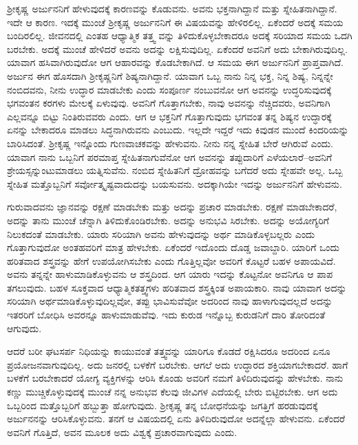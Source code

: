 ಶ‍್ರೀಕೃಷ್ಣ ಅರ್ಜುನನಿಗೆ ಹೇಳುವುದಕ್ಕೆ ಕಾರಣವನ್ನು ಕೊಡುವನು. ಅವನು ಭಕ್ತನಾಗಿದ್ದಾನೆ ಮತ್ತು ಸ್ನೇಹಿತನಾಗಿದ್ದಾನೆ. ಇದೇ ಆ ಕಾರಣ. ಇದಕ್ಕೆ ಮುಂಚೆ ಶ‍್ರೀಕೃಷ್ಣ ಅರ್ಜುನನಿಗೆ ಈ ವಿಷಯವನ್ನು ಹೇಳಿರಲಿಲ್ಲ. ಏಕೆಂದರೆ ಅದಕ್ಕೆ ಸಮಯ ಬಂದಿರಲಿಲ್ಲ. ಜೀವನದಲ್ಲಿ ಎಂತಹ ಆಧ್ಯಾತ್ಮಿಕ ತತ್ತ್ವ ವನ್ನು ತಿಳಿದುಕೊಳ್ಳಬೇಕಾದರೂ ಅದಕ್ಕೆ ಸರಿಯಾದ ಸಮಯ ಒದಗಿ ಬರಬೇಕು. ಅದಕ್ಕೆ ಮುಂಚೆ ಹೇಳಿದರೆ ಅವನು ಅದನ್ನು ಲಕ್ಷಿಸುವುದಿಲ್ಲ. ಏಕೆಂದರೆ ಅವನಿಗೆ ಅದು ಬೇಕಾಗಿರುವುದಿಲ್ಲ. ಯಾವಾಗ ಹಸಿವಾಗಿರುವುದೋ ಆಗ ಆಹಾರವನ್ನು ಕೊಡಬೇಕಾಗಿದೆ. ಆ ಸಮಯ ಈಗ ಅರ್ಜುನನಿಗೆ ಪ್ರಾಪ್ತವಾಗಿದೆ. ಅರ್ಜುನ ಈಗ ಹೊಸದಾಗಿ ಶ‍್ರೀಕೃಷ್ಣನಿಗೆ ಶಿಷ್ಯನಾಗಿದ್ದಾನೆ. ಯಾವಾಗ ಒಬ್ಬ ನಾನು ನಿನ್ನ ಭಕ್ತ, ನಿನ್ನ ಶಿಷ್ಯ, ನಿನ್ನನ್ನೇ ನಂಬಿದವನು, ನೀನು ಉದ್ಧಾರ ಮಾಡಬೇಕು ಎಂದು ಸಂಪೂರ್ಣ ನಂಬುವನೋ ಆಗ ಅವನನ್ನು ಉದ್ಧರಿಸುವುದಕ್ಕೆ ಭಗವಂತನ ಕರಗಳು ಮೇಲಕ್ಕೆ ಏಳುವುವು. ಅವನಿಗೆ ಗೊತ್ತಾಗಬೇಕು, ನಾವು ಅವನನ್ನು ನೆಚ್ಚಿದವರು, ಅವನಿಗಾಗಿ ಎಲ್ಲವನ್ನೂ ಬಿಟ್ಟು ನಿಂತಿರುವವರು ಎಂದು. ಆಗ ಆ ಭಕ್ತನಿಗೆ ಗೊತ್ತಾಗುವುದು ಭಗವಂತ ತನ್ನ ಶಿಷ್ಯನ ಉದ್ಧಾರಕ್ಕೆ ಏನನ್ನು ಬೇಕಾದರೂ ಮಾಡಲು ಸಿದ್ಧನಾಗಿರುವನು ಎಂಬುದು. ಇಲ್ಲದೇ ಇದ್ದರೆ ಇದು ಕಿವುಡನ ಮುಂದೆ ಕಿಂದರಿಯನ್ನು ಬಾರಿಸಿದಂತೆ. ಶ‍್ರೀಕೃಷ್ಣ ಇನ್ನೊಂದು ಗುಣವಾಚಕವನ್ನು ಹೇಳುವನು. ನೀನು ನನ್ನ ಸ್ನೇಹಿತ ಬೇರೆ ಆಗಿರುವೆ ಎಂದು. ಯಾವಾಗ ನಾನು ಒಬ್ಬನಿಗೆ ಪರಮಾಪ್ತ ಸ್ನೇಹಿತನಾಗುವೆನೋ ಆಗ ಅವನನ್ನು ತಪ್ಪುದಾರಿಗೆ ಎಳೆಯಲಾರೆ–ಅವನಿಗೆ ಶ್ರೇಯಸ್ಸನ್ನುಂಟುಮಾಡಲು ಯತ್ನಿಸುವೆನು. ನಂಬಿದ ಸ್ನೇಹಿತನಿಗೆ ದ್ರೋಹವನ್ನು ಬಗೆದರೆ ಅದು ಸ್ನೇಹವೇ ಅಲ್ಲ. ಒಬ್ಬ ಸ್ನೇಹಿತ ಮತ್ತೊಬ್ಬನಿಗೆ ಸರ್ವೋತ್ಕೃಷ್ಟವಾದುದನ್ನು ಬಯಸುವನು. ಅದಕ್ಕಾಗಿಯೇ ಇದನ್ನು ಅರ್ಜುನನಿಗೆ ಹೇಳುವನು.

ಗುರುವಾದವನು ಜ್ಞಾನವನ್ನು ರಕ್ಷಣೆ ಮಾಡಬೇಕು ಮತ್ತು ಅದನ್ನು ಪ್ರಚಾರ ಮಾಡಬೇಕು. ರಕ್ಷಣೆ ಮಾಡಬೇಕಾದರೆ, ಅದನ್ನು ತಾನು ಮುಂಚೆ ಚೆನ್ನಾಗಿ ತಿಳಿದುಕೊಂಡಿರಬೇಕು. ಅದನ್ನು ಅನುಭವಿ ಸಿರಬೇಕು. ಅದನ್ನು ಅಯೋಗ್ಯರಿಗೆ ನಿಲುಕದಂತೆ ಮಾಡಬೇಕು. ಯಾರು ಸರಿಯಾಗಿ ಅವನು ಹೇಳುವುದನ್ನು ಅರ್ಥ ಮಾಡಿಕೊಳ್ಳಬಲ್ಲರು ಎಂದು ಗೊತ್ತಾಗುವುದೋ ಅಂತಹವರಿಗೆ ಮಾತ್ರ ಹೇಳಬೇಕು. ಏಕೆಂದರೆ ಇದೊಂದು ದೊಡ್ಡ ಜವಾಬ್ದಾರಿ. ಯಾರಿಗೆ ಒಂದು ಹರಿತವಾದ ಶಸ್ತ್ರವನ್ನು ಹೇಗೆ ಉಪಯೋಗಿಸಬೇಕು ಎಂದು ಗೊತ್ತಿಲ್ಲವೋ ಅವರಿಗೆ ಕೊಟ್ಟರೆ ಬಹಳ ಅಪಾಯವಿದೆ. ಅವನು ತನ್ನನ್ನೇ ಹಾಳುಮಾಡಿಕೊಳ್ಳುವನು ಆ ಶಸ್ತ್ರದಿಂದ. ಆಗ ಯಾರು ಇದನ್ನು ಕೊಟ್ಟನೋ ಅವನಿಗೂ ಆ ಪಾಪ ತಗಲುವುದು. ಬಹಳ ಸೂಕ್ತವಾದ ಆಧ್ಯಾತ್ಮಿಕತತ್ತ್ವಗಳು ಹರಿತವಾದ ಶಸ್ತ್ರಕ್ಕಿಂತ ಅಪಾಯಕಾರಿ. ನಾವು ಯಾವಾಗ ಅದನ್ನು ಸರಿಯಾಗಿ ಅರ್ಥಮಾಡಿಕೊಳ್ಳುವುದಿಲ್ಲವೋ, ತಪ್ಪು ಭಾವಿಸುವೆವೋ ಅದರಿಂದ ನಾವು ಹಾಳಾಗುವುದಲ್ಲದೆ ಅದನ್ನು ಇತರರಿಗೆ ಬೋಧಿಸಿ ಅವರನ್ನೂ ಹಾಳುಮಾಡುವೆವು. ಇದು ಕುರುಡ ಇನ್ನೊಬ್ಬ ಕುರುಡನಿಗೆ ದಾರಿ ತೋರಿದಂತೆ ಆಗುವುದು.

ಆದರೆ ಬರೀ ಘಟಸರ್ಪ ನಿಧಿಯನ್ನು ಕಾಯುವಂತೆ ತತ್ತ್ವವನ್ನು ಯಾರಿಗೂ ಕೊಡದೆ ರಕ್ಷಿಸಿದರೂ ಅದರಿಂದ ಏನೂ ಪ್ರಯೋಜನವಾಗುವುದಿಲ್ಲ. ಅದು ಜನರಲ್ಲಿ ಬಳಕೆಗೆ ಬರಬೇಕು. ಆಗಲೆ ಅದು ಉದ್ಧಾರದ ಶಕ್ತಿಯಾಗಬೇಕಾದರೆ. ಹಾಗೆ ಬಳಕೆಗೆ ಬರಬೇಕಾದರೆ ಯೋಗ್ಯ ವ್ಯಕ್ತಿಗಳನ್ನು ಆರಿಸಿ ಕೊಂಡು ಅವರಿಗೆ ನಮಗೆ ತಿಳಿದಿರುವುದನ್ನು ಹೇಳಬೇಕು. ನಾನು ಕಣ್ಣು ಮುಚ್ಚಿಕೊಳ್ಳುವುದಕ್ಕೆ ಮುಂಚೆ ನನ್ನ ಅನುಭವ ಕೆಲವು ಜೀವಿಗಳ ಎದೆಯಲ್ಲಿ ಬೇರು ಬಿಟ್ಟಿರಬೇಕು. ಆಗ ಅದು ಒಬ್ಬರಿಂದ ಮತ್ತೊಬ್ಬರಿಗೆ ಹಬ್ಬುತ್ತಾ ಹೋಗುವುದು. ಶ‍್ರೀಕೃಷ್ಣ ತನ್ನ ಬೋಧನೆಯನ್ನು ಜಗತ್ತಿಗೆ ಹರಡುವುದಕ್ಕೆ ಅರ್ಜುನನನ್ನು ಆರಿಸಿಕೊಳ್ಳುವನು. ತನಗೆ ಆ ವಿಷಯದಲ್ಲಿ ಏನು ತಿಳಿದಿರುವುದೋ ಅದನ್ನೆಲ್ಲಾ ಹೇಳುವನು. ಏಕೆಂದರೆ ಅವನಿಗೆ ಗೊತ್ತಿದೆ, ಅವನ ಮೂಲಕ ಅದು ವಿಶ್ವಕ್ಕೆ ಪ್ರಚಾರವಾಗುವುದು ಎಂದು.

